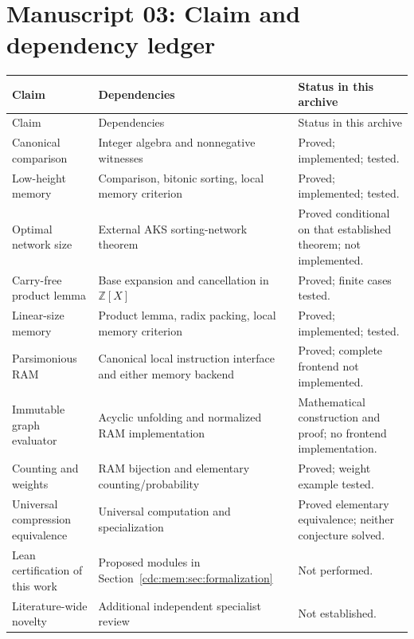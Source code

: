 \documentclass[11pt,a4paper]{article}
\theoremstyle{definition}
\theoremstyle{remark}
\newcommand{\Z}{\mathbb Z}
\begin{document}
\section{Manuscript 03: Claim and dependency ledger}
\begin{longtable}{@{}>{\raggedright\arraybackslash}p{}>{\raggedright\arraybackslash}p{}>{\raggedright\arraybackslash}p{}@{}}
\toprule
Claim & Dependencies & Status in this archive\\
\midrule
\endfirsthead
\toprule
Claim & Dependencies & Status in this archive\\
\midrule
\endhead
Canonical comparison & Integer algebra and nonnegative witnesses & Proved;
implemented; tested.\\
Low-height memory & Comparison, bitonic sorting, local memory criterion &
Proved; implemented; tested.\\
Optimal network size & External AKS sorting-network theorem & Proved conditional
on that established theorem; not implemented.\\
Carry-free product lemma & Base expansion and cancellation in $\Z[X]$ &
Proved; finite cases tested.\\
Linear-size memory & Product lemma, radix packing, local memory criterion &
Proved; implemented; tested.\\
Parsimonious RAM & Canonical local instruction interface and either memory
backend & Proved; complete frontend not implemented.\\
Immutable graph evaluator & Acyclic unfolding and normalized RAM implementation &
Mathematical construction and proof; no frontend implementation.\\
Counting and weights & RAM bijection and elementary counting/probability &
Proved; weight example tested.\\
Universal compression equivalence & Universal computation and specialization &
Proved elementary equivalence; neither conjecture solved.\\
Lean certification of this work & Proposed modules in Section~\ref{cdc:mem:sec:formalization}
& Not performed.\\
Literature-wide novelty & Additional independent specialist review & Not
established.\\
\bottomrule
\end{longtable}



\end{document}
